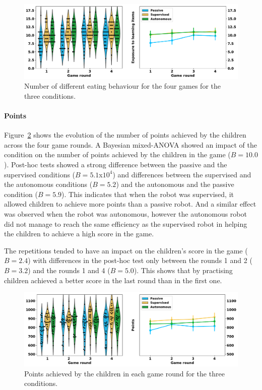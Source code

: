 \begin{figure}[ht]
	\includegraphics[width=1\linewidth]{d_eat.pdf}
	\centering
	\caption{Number of different eating behaviour for the four games for the three conditions.}
	\label{fig:tutoring_d_eat}
\end{figure}

\paragraph{Points}

Figure~\ref{fig:tutoring_points} shows the evolution of the number of points achieved by the children across the four game rounds. A Bayesian mixed-ANOVA showed an impact of the condition on the number of points achieved by the children in the game ($B=10.0$). Post-hoc tests showed a strong difference between the passive and the supervised conditions ($B=5.1$x$10^4$) and differences between the supervised and the autonomous conditions ($B=5.2$) and the autonomous and the passive condition ($B=5.9$). This indicates that when the robot was supervised, it allowed children to achieve more points than a  passive robot. And a similar effect was observed when the robot was autonomous, however the autonomous robot did not manage to reach the same efficiency as the supervised robot in helping the children to achieve a high score in the game.

The repetitions tended to have an impact on the children's score in the game ($B=2.4$) with differences in the post-hoc test only between the rounds 1 and 2 ($B=3.2$) and the rounds 1 and 4 ($B=5.0$). This shows that by practising children achieved a better score in the last round than in the first one.

\begin{figure}[ht]
	\includegraphics[width=1\linewidth]{points.pdf}
	\centering
	\caption{Points achieved by the children in each game round for the three conditions.}
	\label{fig:tutoring_points}
\end{figure}

